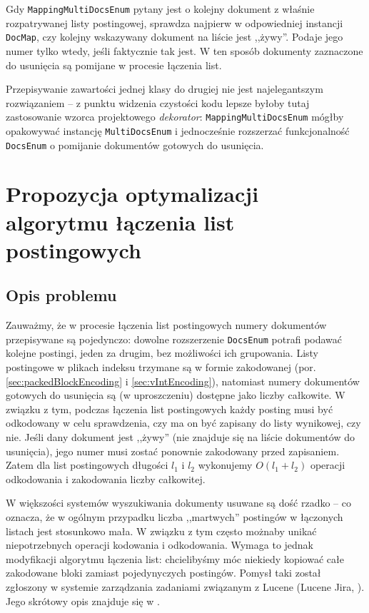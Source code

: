 Gdy \texttt{MappingMultiDocsEnum} pytany jest o kolejny dokument z właśnie rozpatrywanej listy postingowej, sprawdza najpierw w odpowiedniej instancji \texttt{DocMap}, czy kolejny wskazywany dokument na liście jest ,,żywy''. Podaje jego numer tylko wtedy, jeśli faktycznie tak jest. W ten sposób dokumenty zaznaczone do usunięcia są pomijane w procesie łączenia list. 

Przepisywanie zawartości jednej klasy do drugiej nie jest najelegantszym rozwiązaniem -- z punktu widzenia czystości kodu lepsze byłoby tutaj zastosowanie wzorca projektowego \emph{dekorator}: \texttt{MappingMultiDocsEnum} mógłby opakowywać instancję \texttt{MultiDocsEnum} i jednocześnie rozszerzać funkcjonalność \texttt{DocsEnum} o pomijanie dokumentów gotowych do usunięcia.

\section{Propozycja optymalizacji algorytmu łączenia list postingowych}

\subsection{Opis problemu}

Zauważmy, że w procesie łączenia list postingowych numery dokumentów przepisywane są pojedynczo: dowolne rozszerzenie \texttt{DocsEnum} potrafi podawać kolejne postingi, jeden za drugim, bez możliwości ich grupowania. Listy postingowe w plikach indeksu trzymane są w formie zakodowanej (por. \ref{sec:packedBlockEncoding} i \ref{sec:vIntEncoding}), natomiast numery dokumentów gotowych do usunięcia są (w uproszczeniu) dostępne jako liczby całkowite. W związku z tym, podczas łączenia list postingowych każdy posting musi być odkodowany w celu sprawdzenia, czy ma on być zapisany do listy wynikowej, czy nie. Jeśli dany dokument jest ,,żywy'' (nie znajduje się na liście dokumentów do usunięcia), jego numer musi zostać ponownie zakodowany przed zapisaniem. Zatem dla list postingowych długości $l_1$ i $l_2$ wykonujemy $O(l_1 + l_2)$ operacji odkodowania i zakodowania liczby całkowitej.

W większości systemów wyszukiwania dokumenty usuwane są dość rzadko -- co oznacza, że w ogólnym przypadku liczba ,,martwych'' postingów w łączonych listach jest stosunkowo mała. W związku z tym często możnaby unikać niepotrzebnych operacji kodowania i odkodowania. Wymaga to jednak modyfikacji algorytmu łączenia list: chcielibyśmy móc niekiedy kopiować całe zakodowane bloki zamiast pojedynyczych postingów. Pomysł taki został zgłoszony w systemie zarządzania zadaniami związanym z Lucene (Lucene Jira, \cite{jira}). Jego skrótowy opis znajduje się w \cite{idea}.

